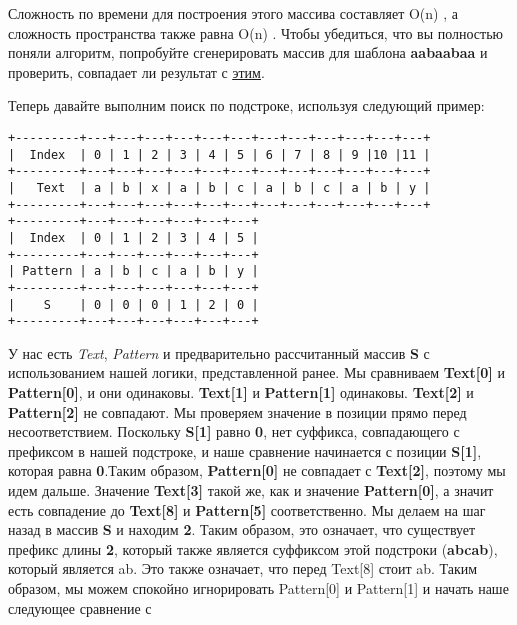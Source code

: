 \vspace{\baselineskip}
Сложность по времени для построения этого массива составляет O(n)%
, а сложность пространства также
равна O(n)%
. Чтобы убедиться, что вы полностью поняли алгоритм, попробуйте сгенерировать массив для
шаблона \textbf{aabaabaa} и проверить, совпадает ли результат с \href{https://i.stack.imgur.com/4aqZk.jpg}{\underline{этим}}.
\vspace{\baselineskip}

Теперь давайте выполним поиск по подстроке, используя следующий пример:
\vspace{\baselineskip}
\begin{tcolorbox}
\begin{verbatim}
+---------+---+---+---+---+---+---+---+---+---+---+---+---+
|  Index  | 0 | 1 | 2 | 3 | 4 | 5 | 6 | 7 | 8 | 9 |10 |11 |
+---------+---+---+---+---+---+---+---+---+---+---+---+---+
|   Text  | a | b | x | a | b | c | a | b | c | a | b | y |
+---------+---+---+---+---+---+---+---+---+---+---+---+---+
+---------+---+---+---+---+---+---+
|  Index  | 0 | 1 | 2 | 3 | 4 | 5 |
+---------+---+---+---+---+---+---+
| Pattern | a | b | c | a | b | y |
+---------+---+---+---+---+---+---+
|    S    | 0 | 0 | 0 | 1 | 2 | 0 |
+---------+---+---+---+---+---+---+
\end{verbatim}
\end{tcolorbox}
\vspace{\baselineskip}
У нас есть \textit{Text}, \textit{Pattern} и предварительно рассчитанный массив \textbf{S} с использованием нашей
логики, представленной ранее. Мы сравниваем \textbf{Text[0]} и \textbf{Pattern[0]}, и они одинаковы.
\textbf{Text[1]} и \textbf{Pattern[1]} одинаковы. \textbf{Text[2]} и \textbf{Pattern[2]} не совпадают.
Мы проверяем значение в позиции
прямо перед несоответствием. Поскольку \textbf{S[1]} равно \textbf{0}, нет суффикса, совпадающего с
префиксом в нашей подстроке, и наше сравнение начинается с позиции \textbf{S[1]}, которая равна \textbf{0}.Таким образом, \textbf{Pattern[0]} не совпадает с \textbf{Text[2]}, поэтому мы идем дальше. Значение \textbf{Text[3]}
такой же, как и значение \textbf{Pattern[0]}, а значит есть совпадение до \textbf{Text[8]} и \textbf{Pattern[5]}
соответственно. Мы делаем на шаг назад в массив \textbf{S} и находим \textbf{2}.
Таким образом, это означает,
что существует префикс длины \textbf{2}, который также является суффиксом этой подстроки (\textbf{abcab}),
который является ab. Это также означает, что перед Text[8] стоит ab. Таким образом, мы
можем спокойно игнорировать Pattern[0] и Pattern[1] и начать наше следующее сравнение с
